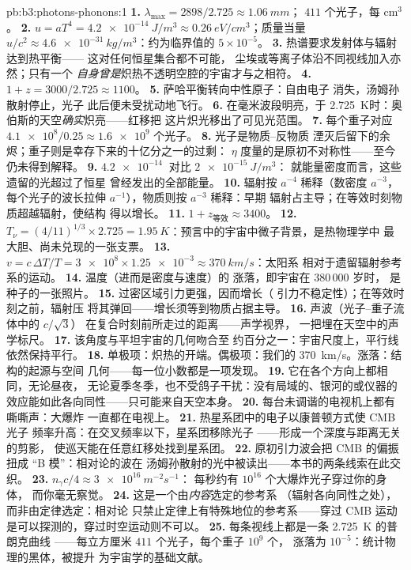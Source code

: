 \begin{solution}{pb:b3:photons-phonons:1}
\textbf{1.} $\lambda_{\max} = 2898/2.725 \approx \qty{1.06}{mm}$；
$411$ 个光子，每 cm$^3$。
\textbf{2.} $u = aT^4 = \qty{4.2e-14}{J/m^3} \approx
\qty{0.26}{eV/cm^3}$；质量当量 $u/c^2 \approx
\qty{4.6e-31}{kg/m^3}$：约为临界值的 $5\times10^{-5}$。
\textbf{3.} 热谱要求发射体与辐射达到热平衡——
这对任何恒星集合都不可能，
尘埃或等离子体沿不同视线加入亦然；只有一个
\emph{自身曾是}炽热不透明空腔的宇宙才与之相符。
\textbf{4.} $1 + z = 3000/2.725 \approx 1100$。
\textbf{5.} 萨哈平衡转向中性原子：自由电子
消失，汤姆孙散射停止，光子
此后便未受扰动地飞行。
\textbf{6.} 在毫米波段明亮，于
\qty{2.725}{K}时：奥伯斯的天空\emph{确实}炽亮——红移把
这片炽光移出了可见光范围。
\textbf{7.} 每个重子对应 $\num{4.1e8}/0.25 \approx \num{1.6e9}$
个光子。
\textbf{8.} 光子是物质–反物质
湮灭后留下的余烬；重子则是幸存下来的十亿分之一的过剩：
$\eta$ 度量的是原初不对称性——至今
仍未得到解释。
\textbf{9.} $\qty{4.2e-14}{}$ 对比 $\qty{2e-15}{J/m^3}$：
就能量密度而言，这些遗留的光超过了恒星
曾经发出的全部能量。
\textbf{10.} 辐射按 $a^{-4}$ 稀释（数密度 $a^{-3}$，
每个光子的波长拉伸 $a^{-1}$），物质则按 $a^{-3}$ 稀释：早期
辐射占主导；在等效时刻物质超越辐射，使结构
得以增长。
\textbf{11.} $1 + z_{\text{等效}} \approx 3400$。
\textbf{12.} $T_\nu = (4/11)^{1/3} \times 2.725 =
\qty{1.95}{K}$：预言中的宇宙中微子背景，是热物理学中
最大胆、尚未兑现的一张支票。
\textbf{13.} $v = c\,\Delta T/T = \num{3e8} \times \num{1.25e-3}
\approx \qty{370}{km/s}$：太阳系
相对于遗留辐射参考系的运动。
\textbf{14.} 温度（进而是密度与速度）的
涨落，即宇宙在 380\,000 岁时，
是种子的一张照片。
\textbf{15.} 过密区域引力更强，因而增长（
引力不稳定性）；在等效时刻之前，辐射压
将其弹回——增长须等到物质占据主导。
\textbf{16.} 声波（光子–重子流体中的 $c/\sqrt3$）
在复合时刻前所走过的距离——声学视界，
一把埋在天空中的声学标尺。
\textbf{17.} 该角度与平坦宇宙的几何吻合至
约百分之一：宇宙尺度上，平行线依然保持平行。
\textbf{18.} 单极项：炽热的开端。偶极项：我们的
\qty{370}{km/s}。涨落：结构的起源与空间
几何——每一位小数都是一项发现。
\textbf{19.} 它在各个方向上都相同，无论昼夜，
无论夏季冬季，也不受鸽子干扰：没有局域的、银河的或仪器的
效应能如此各向同性——只可能来自天空本身。
\textbf{20.} 每台未调谐的电视机上都有嘶嘶声：大爆炸
一直都在电视上。
\textbf{21.} 热星系团中的电子以康普顿方式使 CMB 光子
频率升高：在交叉频率以下，星系团移除光子
——形成一个深度与距离无关的剪影，
使巡天能在任意红移处找到星系团。
\textbf{22.} 原初引力波会把 CMB 的偏振扭成
“B 模”：相对论的波在
汤姆孙散射的光中被读出——本书的两条线索在此交织。
\textbf{23.} $n_\gamma c/4 \approx \qty{3e16}{m^{-2}s^{-1}}$：
每秒约有 $10^{16}$ 个大爆炸光子穿过你的身体，
而你毫无察觉。
\textbf{24.} 这是一个由\emph{内容}选定的参考系
（辐射各向同性之处），而非由定律选定：相对论
只禁止定律上有特殊地位的参考系——穿过 CMB 运动
是可以探测的，穿过时空运动则不可以。
\textbf{25.} 每条视线上都是一条 \qty{2.725}{K} 的普朗克曲线
——每立方厘米 $411$ 个光子，每个重子 $10^9$ 个，
涨落为 $10^{-5}$：统计物理的黑体，被提升
为宇宙学的基础文献。
\end{solution}
